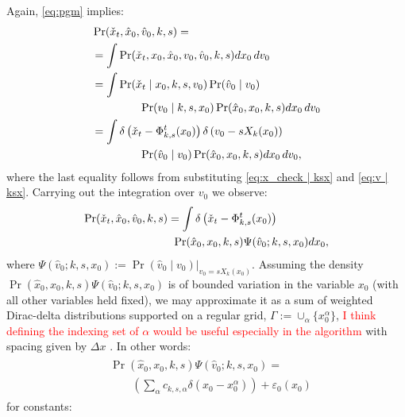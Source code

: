\documentclass[letterpaper,10pt,conference]{ieeeconf}
\newcommand{\Ram}[1]{\textcolor{red}{#1}}
\begin{document}
Again, \eqref{eq:pgm} implies:
\begin{align}
	&\Pr( \check{x}_t , \hat{x}_0, \hat{v}_0, k,s) = \\
	&= \int \Pr( \check{x}_t , x_0, \hat{x}_0, v_0, \hat{v}_0, k,s) dx_0 \, dv_0 \\
	&= \int \Pr( \check{x}_t \mid  x_0, k,s, v_0) \Pr( \hat{v}_0 \mid v_0) \\
	& \hspace{10ex}  \Pr( v_0 \mid k,s,x_0) \Pr(\hat{x}_0, x_0, k, s) dx_0 \, dv_0 \nonumber \\
		&= \int \delta\left( \check{x}_t - \Phi_{k,s}^{t}( x_0) \right) \delta\left( v_0 - s X_k (x_0) \right) \\
		&\hspace{10ex}\Pr( \hat{v}_0 \mid v_0) \Pr(\hat{x}_0, x_0,k, s) dx_0\, dv_0, \nonumber
\end{align}
where the last equality follows from substituting \eqref{eq:x_check | ksx} and \eqref{eq:v | ksx}.
 Carrying out the integration over $v_0$ we observe:
\begin{align}
\begin{split}
	\Pr( \check{x}_t , \hat{x}_0, \hat{v}_0, k,s) &= \int \delta\left( \check{x}_t - \Phi_{k,s}^{t}( x_0) \right)  \\
	&\hspace{1ex} \Pr(\hat{x}_0, x_0, k, s) \Psi(\hat{v}_0 ;k,s,x_0) dx_0,
\end{split}
\label{eq:push forward}
\end{align}
where $\Psi( \hat{v}_0 ;k,s,x_0) := \left. \Pr( \hat{v}_0 \mid v_0) \right|_{v_0 = s X_k(x_0)}$.
 Assuming the density $\Pr(\hat{x}_0, x_0, k, s) \Psi( \hat{v}_0 ; k, s, x_0)$ is of bounded variation in the variable $x_0$ (with all other variables held fixed),
 we may approximate it as a sum of weighted Dirac-delta distributions supported on a regular grid, $\Gamma := \cup_{\alpha} \{ x_0^\alpha\}$, \Ram{I think defining the indexing set of $\alpha$ would be useful especially in the algorithm} with spacing given by $\Delta x$ \cite{Rudin1991}.
In other words:
\begin{align}
	\begin{split}
		&\Pr(\hat{x}_0, x_0, k, s) \Psi( \hat{v}_0 ; k, s, x_0 ) = \\
		&\qquad \left( \sum_{\alpha} c_{k,s,\alpha} \delta( x_0 - x_0^\alpha ) \right) + \varepsilon_0(x_0)
	\end{split}
	\label{eq:approximation 1}
\end{align}
for constants:
\end{document}
